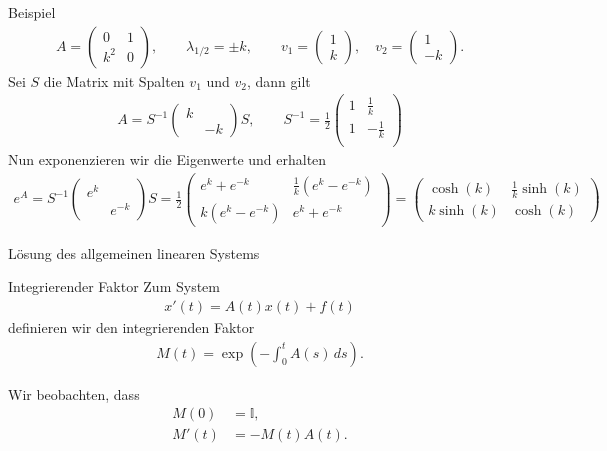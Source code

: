 \begin{frame}{Beispiel}
  \begin{gather*}
    A =
    \begin{pmatrix}
      0 & 1\\k^2 & 0
    \end{pmatrix},
    \qquad \lambda_{1/2} = \pm k,
    \qquad v_1 =
    \begin{pmatrix}
      1\\k
    \end{pmatrix},
    \quad
    v_2 =
    \begin{pmatrix}
      1 \\ -k
    \end{pmatrix}.
  \end{gather*}
  \pause
  Sei $S$ die Matrix mit Spalten $v_1$ und $v_2$, dann gilt
  \begin{gather*}
    A = S^{-1}
    \begin{pmatrix}
      k \\ &-k
    \end{pmatrix}
    S,
    \qquad
    S^{-1} =
    \frac12
    \begin{pmatrix}
      1 & \tfrac1k\\
      1 & -\tfrac1k\\
    \end{pmatrix}
  \end{gather*}
  \pause
  Nun exponenzieren wir die Eigenwerte und erhalten
  \begin{gather*}
    e^A =  S^{-1}
    \begin{pmatrix}
      e^k \\ &e^{-k}
    \end{pmatrix}
    S
    = \frac12
    \begin{pmatrix}
      e^k + e^{-k} & \tfrac 1k (e^k - e^{-k}) \\
      k (e^k - e^{-k}) & e^k + e^{-k}
    \end{pmatrix}
    =
    \begin{pmatrix}
      \cosh(k) & \tfrac 1k \sinh(k) \\
      k \sinh(k) & \cosh(k)
    \end{pmatrix}
  \end{gather*}
  \vspace*{.9\textheight}
\end{frame}

\begin{frame}{Lösung des allgemeinen linearen Systems}
  \begin{block}{Integrierender Faktor}
    Zum System
    \begin{gather*}
      x'(t) = A(t) x(t) + f(t)
    \end{gather*}
    definieren wir den integrierenden Faktor
    \begin{gather*}
      M(t) = \exp\left(-\int_0^t A(s) \,ds\right).
    \end{gather*}
  \end{block}
  Wir beobachten, dass
  \begin{align*}
    M(0) &= \mathbb I,\\
    M'(t) &= -M(t) A(t).
  \end{align*}
\end{frame}

